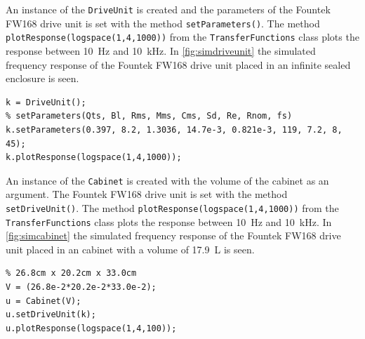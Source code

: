 An instance of the \texttt{DriveUnit} is created and the parameters of the Fountek FW168 drive unit is set with the method \texttt{setParameters()}.
The method \texttt{plotResponse(logspace(1,4,1000))} from the \texttt{TransferFunctions} class plots the response between \SI{10}{\hertz} and \SI{10}{\kilo\hertz}.
In \cref{fig:simdriveunit} the simulated frequency response of the Fountek FW168 drive unit placed in an infinite sealed enclosure is seen.
\begin{verbatim}
k = DriveUnit();
% setParameters(Qts, Bl, Rms, Mms, Cms, Sd, Re, Rnom, fs)
k.setParameters(0.397, 8.2, 1.3036, 14.7e-3, 0.821e-3, 119, 7.2, 8, 45); 
k.plotResponse(logspace(1,4,1000));
\end{verbatim}

An instance of the \texttt{Cabinet} is created with the volume of the cabinet as an argument.
The Fountek FW168 drive unit is set with the method \texttt{setDriveUnit()}.
The method \texttt{plotResponse(logspace(1,4,1000))} from the \texttt{TransferFunctions} class plots the response between \SI{10}{\hertz} and \SI{10}{\kilo\hertz}.
In \cref{fig:simcabinet} the simulated frequency response of the Fountek FW168 drive unit placed in an cabinet with a volume of \SI{17.9}{\liter} is seen. 

\begin{verbatim}
% 26.8cm x 20.2cm x 33.0cm
V = (26.8e-2*20.2e-2*33.0e-2); 
u = Cabinet(V);
u.setDriveUnit(k);
u.plotResponse(logspace(1,4,100));
\end{verbatim}


